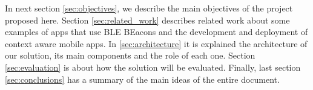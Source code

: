 In next section \ref{sec:objectives}, we describe the main
objectives of the project proposed here.
Section \ref{sec:related_work} describes related
work about some examples of apps that use BLE BEacons
and the development and deployment of
context aware mobile apps.
In \ref{sec:architecture} it is explained the architecture of our solution, its main components and the role of
each one.
Section \ref{sec:evaluation} is about how the solution
will be evaluated.
Finally, last section \ref{sec:conclusions} has a summary of
the main ideas of the entire document.
